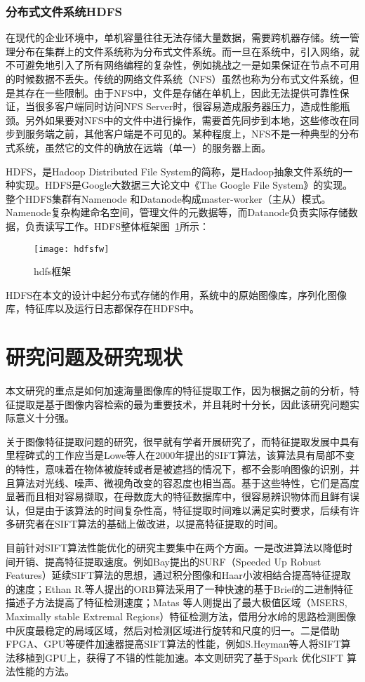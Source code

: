 \subsubsection{分布式文件系统HDFS}
在现代的企业环境中，单机容量往往无法存储大量数据，需要跨机器存储。统一管理分布在集群上的文件系统称为分布式文件系统。而一旦在系统中，引入网络，就不可避免地引入了所有网络编程的复杂性，例如挑战之一是如果保证在节点不可用的时候数据不丢失。传统的网络文件系统（NFS）虽然也称为分布式文件系统，但是其存在一些限制。由于NFS中，文件是存储在单机上，因此无法提供可靠性保证，当很多客户端同时访问NFS Server时，很容易造成服务器压力，造成性能瓶颈。另外如果要对NFS中的文件中进行操作，需要首先同步到本地，这些修改在同步到服务端之前，其他客户端是不可见的。某种程度上，NFS不是一种典型的分布式系统，虽然它的文件的确放在远端（单一）的服务器上面。

HDFS，是Hadoop Distributed File System的简称，是Hadoop抽象文件系统的一种实现。HDFS是Google大数据三大论文中《The Google File System》的实现。整个HDFS集群有Namenode 和Datanode构成master-worker（主从）模式。Namenode复杂构建命名空间，管理文件的元数据等，而Datanode负责实际存储数据，负责读写工作。HDFS整体框架图~\ref{fig:hdfsfw}所示：
\begin{figure}[htp]
\centering
\texttt{[image: hdfsfw]}
\caption{hdfs框架}
\label{fig:hdfsfw}
\end{figure}

HDFS在本文的设计中起分布式存储的作用，系统中的原始图像库，序列化图像库，特征库以及运行日志都保存在HDFS中。

\section{研究问题及研究现状}
本文研究的重点是如何加速海量图像库的特征提取工作，因为根据之前的分析，特征提取是基于图像内容检索的最为重要技术，并且耗时十分长，因此该研究问题实际意义十分强。

关于图像特征提取问题的研究，很早就有学者开展研究了，而特征提取发展中具有里程碑式的工作应当是Lowe等人在2000年提出的SIFT算法，该算法具有局部不变的特性，意味着在物体被旋转或者是被遮挡的情况下，都不会影响图像的识别，并且算法对光线、噪声、微视角改变的容忍度也相当高。基于这些特性，它们是高度显著而且相对容易撷取，在母数庞大的特征数据库中，很容易辨识物体而且鲜有误认，但是由于该算法的时间复杂性高，特征提取时间难以满足实时要求，后续有许多研究者在SIFT算法的基础上做改进，以提高特征提取的时间。

目前针对SIFT算法性能优化的研究主要集中在两个方面。一是改进算法以降低时间开销、提高特征提取速度。例如Bay提出的SURF（Speeded Up Robust Features）延续SIFT算法的思想，通过积分图像和Haar小波相结合提高特征提取的速度；Ethan R.等人提出的ORB算法采用了一种快速的基于Brief的二进制特征描述子方法提高了特征检测速度；Matas 等人则提出了最大极值区域（MSERS, Maximally stable Extremal Regions）特征检测方法，借用分水岭的思路检测图像中灰度最稳定的局域区域，然后对检测区域进行旋转和尺度的归一。二是借助FPGA、GPU等硬件加速器提高SIFT算法的性能，例如S.Heyman等人将SIFT算法移植到GPU上，获得了不错的性能加速。本文则研究了基于Spark 优化SIFT 算法性能的方法。

